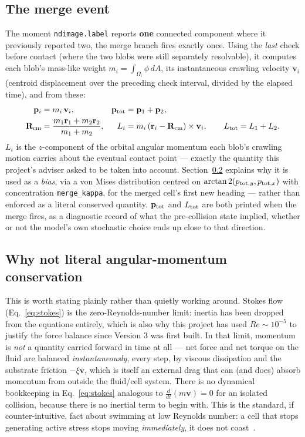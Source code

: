 \documentclass[11pt]{article}
\newcommand{\bv}{\mathbf{v}}
\newcommand{\br}{\mathbf{r}}
\newcommand{\bp}{\mathbf{p}}
\newcommand{\bR}{\mathbf{R}}
\begin{document}
\subsection{The merge event}
\label{sec:merge}
The moment \texttt{ndimage.label} reports \textbf{one} connected
component where it previously reported two, the merge branch fires
exactly once. Using the \emph{last} check before contact (where the
two blobs were still separately resolvable), it computes each blob's
mass-like weight $m_i=\int_{\Omega_i}\phi\,dA$, its instantaneous
crawling velocity $\bv_i$ (centroid displacement over the preceding
check interval, divided by the elapsed time), and from these:
\begin{align}
\bp_i &= m_i\,\bv_i, &
\bp_{\rm tot} &= \bp_1+\bp_2,\\
\bR_{\rm cm} &= \frac{m_1\br_1+m_2\br_2}{m_1+m_2}, &
L_i &= m_i\,(\br_i-\bR_{\rm cm})\times\bv_i,
\qquad L_{\rm tot}=L_1+L_2.
\label{eq:momentum}
\end{align}
$L_i$ is the $z$-component of the orbital angular momentum each
blob's crawling motion carries about the eventual contact point —
exactly the quantity this project's adviser asked to be taken into
account. Section~\ref{sec:nointertia} explains why it is used as a
\emph{bias}, via a von Mises distribution centred on
$\arctan2(p_{{\rm tot},y},p_{{\rm tot},x})$ with concentration
\texttt{merge\_kappa}, for the merged cell's first new heading —
rather than enforced as a literal conserved quantity. $\bp_{\rm tot}$
and $L_{\rm tot}$ are both printed when the merge fires, as a
diagnostic record of what the pre-collision state implied, whether or
not the model's own stochastic choice ends up close to that
direction.

\subsection{Why not literal angular-momentum conservation}
\label{sec:nointertia}
This is worth stating plainly rather than quietly working around.
Stokes flow (Eq.~\eqref{eq:stokes}) is the zero-Reynolds-number
limit: inertia has been dropped from the equations entirely, which is
also why this project has used $Re\sim10^{-5}$ to justify the force
balance since Version 3 was first built. In that limit, momentum is
\emph{not} a quantity carried forward in time at all — net force and
net torque on the fluid are balanced \emph{instantaneously}, every
step, by viscous dissipation and the substrate friction $-\xi\bv$,
which is itself an external drag that can (and does) absorb momentum
from outside the fluid/cell system. There is no dynamical bookkeeping
in Eq.~\eqref{eq:stokes} analogous to $\tfrac{d}{dt}(m\bv)=0$ for an
isolated collision, because there is no inertial term to begin with.
This is the standard, if counter-intuitive, fact about swimming at low
Reynolds number: a cell that stops generating active stress stops
moving \emph{immediately}, it does not coast~\cite{Purcell1977}.
\end{document}
